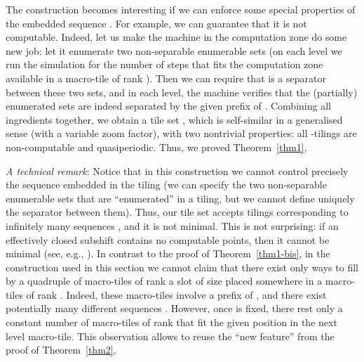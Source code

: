\documentclass[runningheads]{llncs}
\begin{document}
The construction becomes interesting if we can enforce some special properties of the embedded sequence . For example, we can guarantee that it is not computable. Indeed, let us make the machine in the computation zone do some new job: let it enumerate two non-separable enumerable sets (on each level  we run the simulation for the  number of steps that fits the  computation zone available in a macro-tile of rank ). Then we can require that  is a separator between these two sets, and in each level,  the machine verifies that the (partially) enumerated sets are indeed separated by the given prefix of .
Combining all ingredients together, we obtain a tile set , which is self-similar in a generalised sense (with a variable zoom factor), with two nontrivial properties: all -tilings are non-computable and quasiperiodic. Thus,  we proved Theorem~\ref{thm1}. 

\noindent
\emph{A technical remark}:
Notice that in this construction we cannot control precisely the sequence  embedded in the tiling (we can specify  the two non-separable enumerable sets that are ``enumerated'' in a tiling, but we cannot define uniquely the separator  between them). Thus, our tile set accepts tilings corresponding to infinitely many sequences , and it is not minimal. This is not surprising:  if an effectively closed subshift contains no computable points, then it cannot be minimal (see, e.g., \cite{hochman-2009}).
In contrast to the proof of Theorem~\ref{thm1-bis},
in the construction used in this section we cannot claim that there exist only  ways to fill 
by a quadruple of macro-tiles of rank 
a slot of size   placed somewhere in a macro-tiles of rank . Indeed, these macro-tiles involve a prefix of  , and there exist potentially many different sequences . However, once  is fixed, there rest only a constant number of  macro-tiles of rank  that fit the given position in the next level macro-tile. This observation allows to reuse the ``new feature'' from the proof of Theorem~\ref{thm2}.
\end{document}
